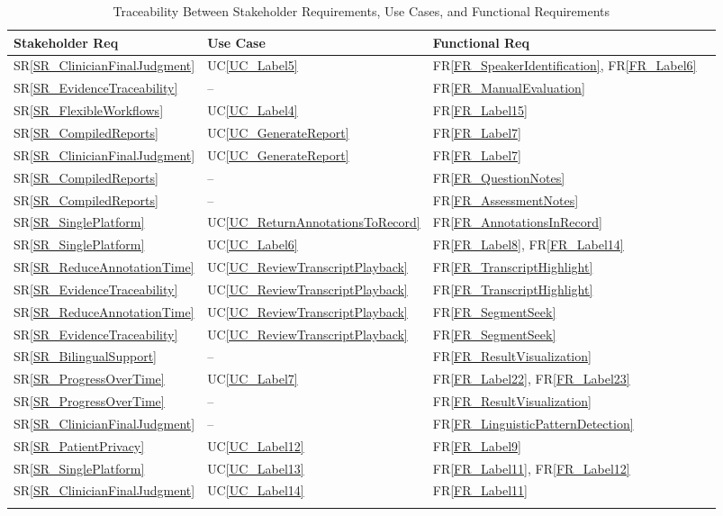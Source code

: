 \documentclass[12pt]{article}
\newcommand{\srref}[1]{SR\ref{#1}}
\newcommand{\ucref}[1]{UC\ref{#1}}
\newcommand{\rref}[1]{FR\ref{#1}}
\begin{document}
\begin{longtable}{p{} p{} p{} p{}}

\toprule
Stakeholder Req & Use Case & Functional Req \\
\midrule
\srref{SR_ClinicianFinalJudgment} & \ucref{UC_Label5} &  \rref{FR_SpeakerIdentification}, \rref{FR_Label6} \\
\srref{SR_EvidenceTraceability} & -- & \rref{FR_ManualEvaluation} \\
\srref{SR_FlexibleWorkflows} & \ucref{UC_Label4} & \rref{FR_Label15} \\
\srref{SR_CompiledReports} & \ucref{UC_GenerateReport} & \rref{FR_Label7} \\
\srref{SR_ClinicianFinalJudgment} & \ucref{UC_GenerateReport} & \rref{FR_Label7} \\
\srref{SR_CompiledReports} & -- & \rref{FR_QuestionNotes} \\
\srref{SR_CompiledReports} & -- & \rref{FR_AssessmentNotes} \\
\srref{SR_SinglePlatform} & \ucref{UC_ReturnAnnotationsToRecord} & \rref{FR_AnnotationsInRecord} \\
\srref{SR_SinglePlatform} & \ucref{UC_Label6} & \rref{FR_Label8}, \rref{FR_Label14} \\
\srref{SR_ReduceAnnotationTime} & \ucref{UC_ReviewTranscriptPlayback} & \rref{FR_TranscriptHighlight} \\
\srref{SR_EvidenceTraceability} & \ucref{UC_ReviewTranscriptPlayback} & \rref{FR_TranscriptHighlight} \\
\srref{SR_ReduceAnnotationTime} & \ucref{UC_ReviewTranscriptPlayback} & \rref{FR_SegmentSeek} \\
\srref{SR_EvidenceTraceability} & \ucref{UC_ReviewTranscriptPlayback} & \rref{FR_SegmentSeek} \\
\srref{SR_BilingualSupport} & -- & \rref{FR_ResultVisualization} \\
\srref{SR_ProgressOverTime} & \ucref{UC_Label7} & \rref{FR_Label22}, \rref{FR_Label23} \\
\srref{SR_ProgressOverTime} & -- & \rref{FR_ResultVisualization} \\
\srref{SR_ClinicianFinalJudgment} & -- & \rref{FR_LinguisticPatternDetection} \\
\srref{SR_PatientPrivacy} & \ucref{UC_Label12} & \rref{FR_Label9} \\
\srref{SR_SinglePlatform} & \ucref{UC_Label13} & \rref{FR_Label11}, \rref{FR_Label12} \\
\srref{SR_ClinicianFinalJudgment} & \ucref{UC_Label14} & \rref{FR_Label11} \\

\bottomrule

\caption{Traceability Between Stakeholder Requirements, Use Cases, and
Functional Requirements} \label{tab:SR2UC2FRtm}
\end{longtable}
\end{document}
